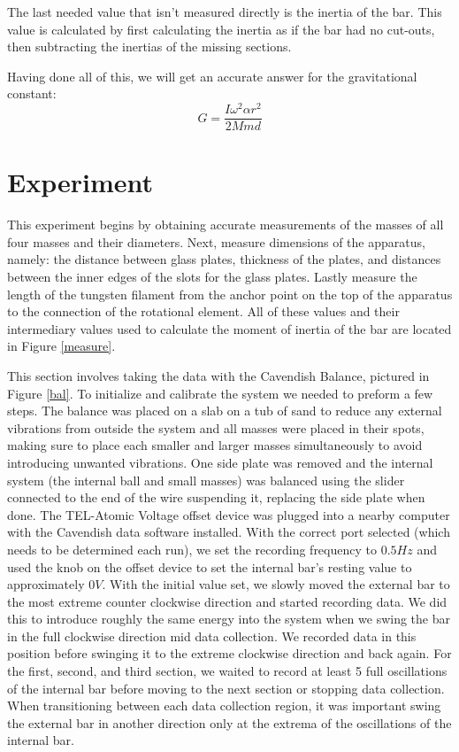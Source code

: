 \documentclass[aps,prl,10pt,twocolumn,floatfix]{revtex4-2}
\begin{document}
The last needed value that isn't measured directly is the inertia of the bar. 
This value is calculated by first calculating the inertia as if the bar had no cut-outs, then subtracting the inertias of the missing sections. 

Having done all of this, we will get an accurate answer for the gravitational constant:
\begin{equation}
G=\frac{I\omega^2\alpha r^2}{2M m d}
\end{equation}

\section{Experiment}
This experiment begins by obtaining accurate measurements of the masses of all four masses and their diameters. 
Next, measure dimensions of the apparatus, namely: the distance between glass plates, thickness of the plates, and distances between the inner edges of the slots for the glass plates.
Lastly measure the length of the tungsten filament from the anchor point on the top of the apparatus to the connection of the rotational element. 
All of these values and their intermediary values used to calculate the moment of inertia of the bar are located in Figure \ref{measure}.

This section involves taking the data with the Cavendish Balance, pictured in Figure \ref{bal}.
To initialize and calibrate the system we needed to preform a few steps. 
The balance was placed on a slab on a tub of sand to reduce any external vibrations from outside the system and all masses were placed in their spots, making sure to place each smaller and larger masses simultaneously to avoid introducing unwanted vibrations.
One side plate was removed and the internal system (the internal ball and small masses) was balanced using the slider connected to the end of the wire suspending it, replacing the side plate when done.
The TEL-Atomic Voltage offset device was plugged into a nearby computer with the Cavendish data software installed. 
With the correct port selected (which needs to be determined each run), we set the recording frequency to $0.5 Hz$ and used the knob on the offset device to set the internal bar's resting value to approximately $0V$. 
With the initial value set, we slowly moved the external bar to the most extreme counter clockwise direction and started recording data.
We did this to introduce roughly the same energy into the system when we swing the bar in the full clockwise direction mid data collection. 
We recorded data in this position before swinging it to the extreme clockwise direction and back again. 
For the first, second, and third section, we waited to record at least 5 full oscillations of the internal bar before moving to the next section or stopping data collection. 
When transitioning between each data collection region, it was important swing the external bar in another direction only at the extrema of the oscillations of the internal bar. 
\end{document}

